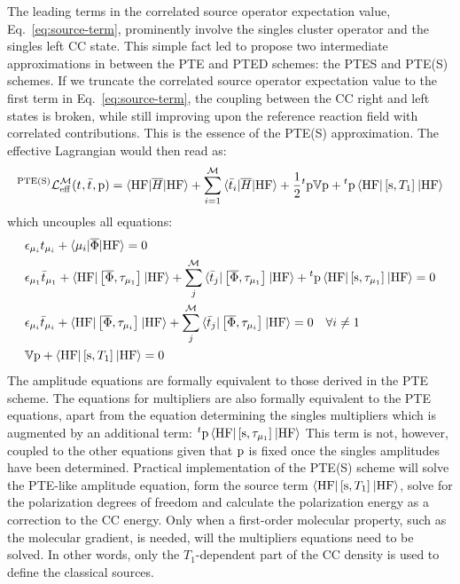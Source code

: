 The leading terms in the correlated source operator expectation
value, Eq.~\eqref{eq:source-term}, prominently involve the singles
cluster operator and the singles left \acs{CC} state.
This simple fact led \citeauthor{Caricato2011-tx} to propose two
intermediate approximations in between the \acs{PTE} and \acs{PTED}
schemes: the \acs{PTES} and \acs{PTE(S)} schemes.
If we truncate the correlated source operator expectation value
to the first term in Eq.~\eqref{eq:source-term}, the coupling between
the \acs{CC} right and left states is broken, while still improving upon the
reference reaction field with correlated contributions.
This is the essence of the \acs{PTE(S)} approximation. The effective
Lagrangian would then read as:
\begin{equation}\label{eq:ptes-cc}
  ^{\mathrm{PTE(S)}}\mathcal{L}^\mathcal{M}_\mathrm{eff}(t_{}, \bar{t}_{}, \mathrm{p}) =
  \braket{\mathrm{HF} | \overline{H} | \mathrm{HF}}
  + \sum_{i=1}^{\mathcal{M}}\braket{\bar{t}_{i} | \overline{H} | \mathrm{HF}}
  + \frac{1}{2}{}^t\mathrm{p}\mathbb{V}\mathrm{p} + {}^t\mathrm{p}
  \braket{\mathrm{HF} | \left[ \mathrm{s}, T_1 \right]^{} | \mathrm{HF}}
\end{equation}
which uncouples all equations:
\begin{subequations}
  \begin{align}
   &\epsilon_{\mu_i}t_{\mu_i} + \braket{\mu_i | \overline{\Phi} | \mathrm{HF}}
   = 0 \\
    &\epsilon_{\mu_1}\bar{t}_{\mu_1} +
    \braket{\mathrm{HF} | \left[ \overline{\Phi}, \tau_{\mu_1} \right]^{} | \mathrm{HF}} +
    \sum_{j}^{\mathcal{M}}\braket{\bar{t}_{j} |
    \left[ \overline{\Phi}, \tau_{\mu_1} \right]^{} | \mathrm{HF}}
    + {}^t\mathrm{p}
    \braket{\mathrm{HF} | \left[ \mathrm{s}, \tau_{\mu_1} \right]^{} | \mathrm{HF}}
    = 0 \\
    &\epsilon_{\mu_i}\bar{t}_{\mu_i} +
    \braket{\mathrm{HF} | \left[ \overline{\Phi}, \tau_{\mu_i} \right]^{} | \mathrm{HF}} +
    \sum_{j}^{\mathcal{M}}\braket{\bar{t}_{j} |
    \left[ \overline{\Phi}, \tau_{\mu_i} \right]^{} | \mathrm{HF}}
    = 0  \quad \forall i \neq 1 \\
    &\mathbb{V}\mathrm{p} + \braket{\mathrm{HF} | \left[ \mathrm{s}, T_1 \right]^{} | \mathrm{HF}} = 0
  \end{align}
\end{subequations}
The amplitude equations are formally equivalent to those derived in the
\acs{PTE} scheme. The equations for multipliers are also formally
equivalent to the \acs{PTE} equations, apart from the equation
determining the singles multipliers which is augmented by an additional term:
${}^t\mathrm{p}\braket{\mathrm{HF} | \left[ \mathrm{s}, \tau_{\mu_1} \right]^{} |
\mathrm{HF}}$
This term is not, however, coupled to the other equations given that
$\mathrm{p}$ is fixed once the singles amplitudes have been determined.
Practical implementation of the \acs{PTE(S)} scheme will solve the
\acs{PTE}-like amplitude equation, form the source term
$\braket{\mathrm{HF} | \left[ \mathrm{s}, T_1 \right]^{} | \mathrm{HF}}$, solve for
the polarization degrees of freedom and calculate the polarization
energy as a correction to the \acs{CC} energy.
Only when a first-order molecular property, such as the molecular
gradient, is needed, will the multipliers equations need to be solved.
In other words, only the $T_1$-dependent part of the \acs{CC} density is
used to define the classical sources.

